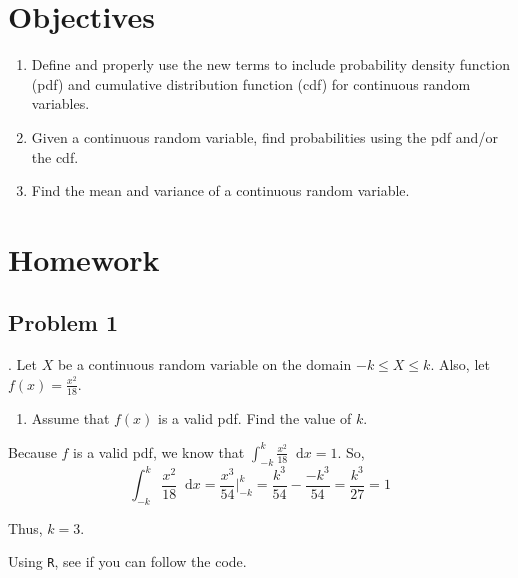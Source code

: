 \documentclass[
]{book}
\newenvironment{Shaded}{\begin{snugshade}}{\end{snugshade}}
\newcommand{\ControlFlowTok}[1]{\textcolor[rgb]{0.13,0.29,0.53}{\textbf{#1}}}
\newcommand{\DecValTok}[1]{\textcolor[rgb]{0.00,0.00,0.81}{#1}}
\newcommand{\KeywordTok}[1]{\textcolor[rgb]{0.13,0.29,0.53}{\textbf{#1}}}
\newcommand{\NormalTok}[1]{#1}
\newcommand{\OperatorTok}[1]{\textcolor[rgb]{0.81,0.36,0.00}{\textbf{#1}}}
\newcommand{\StringTok}[1]{\textcolor[rgb]{0.31,0.60,0.02}{#1}}
\providecommand{\tightlist}{%
  \setlength{\itemsep}{0pt}\setlength{\parskip}{0pt}}
\begin{document}
\hypertarget{objectives-10}{%
\section{Objectives}\label{objectives-10}}

\begin{enumerate}
\def\labelenumi{\arabic{enumi})}
\tightlist
\item
  Define and properly use the new terms to include probability density function (pdf) and cumulative distribution function (cdf) for continuous random variables.\\
\item
  Given a continuous random variable, find probabilities using the pdf and/or the cdf.\\
\item
  Find the mean and variance of a continuous random variable.
\end{enumerate}

\hypertarget{homework-10}{%
\section{Homework}\label{homework-10}}

\hypertarget{problem-1-10}{%
\subsection{Problem 1}\label{problem-1-10}}

. Let \(X\) be a continuous random variable on the domain \(-k \leq X \leq k\). Also, let \(f(x)=\frac{x^2}{18}\).

\begin{enumerate}
\def\labelenumi{\alph{enumi}.}
\tightlist
\item
  Assume that \(f(x)\) is a valid pdf. Find the value of \(k\).
\end{enumerate}

Because \(f\) is a valid pdf, we know that \(\int_{-k}^k \frac{x^2}{18}\mathop{}\!\mathrm{d}x = 1\). So,
\[
\int_{-k}^k \frac{x^2}{18}\mathop{}\!\mathrm{d}x = \frac{x^3}{54}\bigg|_{-k}^k = \frac{k^3}{54}-\frac{-k^3}{54}=\frac{k^3}{27}=1
\]

Thus, \(k=3\).

Using \texttt{R}, see if you can follow the code.

\begin{Shaded}
\end{Shaded}
\end{document}
